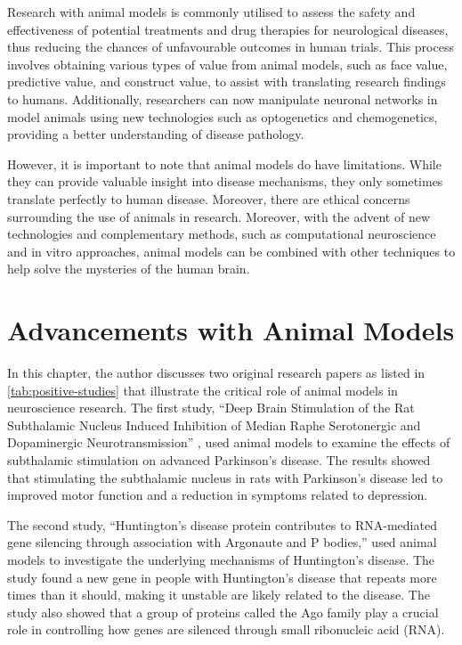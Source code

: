 \documentclass[10pt]{article}
\begin{document}
\begin{sloppypar}
  Research with animal models is commonly utilised to assess the safety and effectiveness of potential treatments and drug therapies for neurological diseases, thus reducing the chances of unfavourable outcomes in human trials. This process involves obtaining various types of value from animal models, such as face value, predictive value, and construct value, to assist with translating research findings to humans. Additionally, researchers can now manipulate neuronal networks in model animals using new technologies such as optogenetics and chemogenetics, providing a better understanding of disease pathology.

  However, it is important to note that animal models do have limitations. While they can provide valuable insight into disease mechanisms, they only sometimes translate perfectly to human disease. Moreover, there are ethical concerns surrounding the use of animals in research. Moreover, with the advent of new technologies and complementary methods, such as computational neuroscience and in vitro approaches, animal models can be combined with other techniques to help solve the mysteries of the human brain.

  \section{Advancements with Animal Models}
  \label{sec:advancements}

  In this chapter, the author discusses two original research papers as listed in \autoref{tab:positive-studies} that illustrate the critical role of animal models in neuroscience research. The first study, “Deep Brain Stimulation of the Rat Subthalamic Nucleus Induced Inhibition of Median Raphe Serotonergic and Dopaminergic Neurotransmission” \citep{kocabicak_deep_2014}, used animal models to examine the effects of subthalamic stimulation on advanced Parkinson’s disease. The results showed that stimulating the subthalamic nucleus in rats with Parkinson’s disease led to improved motor function and a reduction in symptoms related to depression.

  The second study, “Huntington’s disease protein contributes to RNA-mediated gene silencing through association with Argonaute and P bodies,” \citep{savas_huntingtons_2008} used animal models to investigate the underlying mechanisms of Huntington’s disease. The study found a new gene in people with Huntington’s disease that repeats more times than it should, making it unstable are likely related to the disease. The study also showed that a group of proteins called the Ago family play a crucial role in controlling how genes are silenced through small ribonucleic acid (RNA).


\end{sloppypar}
\end{document}
